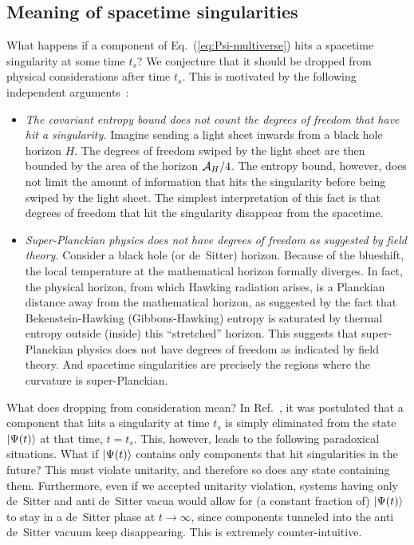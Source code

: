 \documentclass[12pt]{article}
\begin{document}
\subsection{Meaning of spacetime singularities}
\label{subsec:singularities}


What happens if a component of Eq.~(\ref{eq:Psi-multiverse}) hits a 
spacetime singularity at some time $t_s$?  We conjecture that it should 
be dropped from physical considerations after time $t_s$.  This is 
motivated by the following independent arguments~\cite{Nomura:2011dt}:
%
\begin{itemize}
%
\item
{\it The covariant entropy bound does not count the degrees of freedom 
that have hit a singularity.}  Imagine sending a light sheet inwards from 
a black hole horizon $H$.  The degrees of freedom swiped by the light 
sheet are then bounded by the area of the horizon ${\cal A}_H/4$. 
The entropy bound, however, does not limit the amount of information 
that hits the singularity before being swiped by the light sheet.  The 
simplest interpretation of this fact is that degrees of freedom that 
hit the singularity disappear from the spacetime.
%
\item
{\it Super-Planckian physics does not have degrees of freedom as 
suggested by field theory.}  Consider a black hole (or de~Sitter) 
horizon.  Because of the blueshift, the local temperature at the 
mathematical horizon formally diverges.  In fact, the physical horizon, 
from which Hawking radiation arises, is a Planckian distance away from 
the mathematical horizon, as suggested by the fact that Bekenstein-Hawking 
(Gibbons-Hawking) entropy is saturated by thermal entropy outside (inside) 
this ``stretched'' horizon.  This suggests that super-Planckian physics 
does not have degrees of freedom as indicated by field theory.  And 
spacetime singularities are precisely the regions where the curvature 
is super-Planckian.
%
\end{itemize}
%

What does dropping from consideration mean?  In Ref.~\cite{Nomura:2011dt}, 
it was postulated that a component that hits a singularity at time $t_s$ 
is simply eliminated from the state $\left| \Psi(t) \right>$ at that time, $t = t_s$. 
This, however, leads to the following paradoxical situations.  What 
if $\left| \Psi(t) \right>$ contains only components that hit singularities 
in the future?  This must violate unitarity, and therefore so does 
any state containing them.  Furthermore, even if we accepted unitarity 
violation, systems having only de~Sitter and anti de~Sitter vacua would 
allow for (a constant fraction of) $\left| \Psi(t) \right>$ to stay in a de~Sitter 
phase at $t \rightarrow \infty$, since components tunneled into the anti 
de~Sitter vacuum keep disappearing.  This is extremely counter-intuitive.
\end{document}
